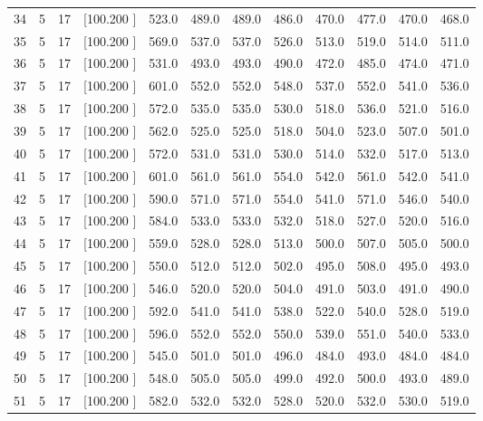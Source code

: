 \documentclass[12pt,a4paper]{article}
\begin{document}
\begin{center}
{\begin{tabular}{r r r r r r r r r r r r}
  34&  5& 17&[100.200   ]&   523.0&   489.0&   489.0&   486.0&   470.0&   477.0&   470.0&   468.0\\[-0.02in]
  35&  5& 17&[100.200   ]&   569.0&   537.0&   537.0&   526.0&   513.0&   519.0&   514.0&   511.0\\[-0.02in]
  36&  5& 17&[100.200   ]&   531.0&   493.0&   493.0&   490.0&   472.0&   485.0&   474.0&   471.0\\[-0.02in]
  37&  5& 17&[100.200   ]&   601.0&   552.0&   552.0&   548.0&   537.0&   552.0&   541.0&   536.0\\[-0.02in]
  38&  5& 17&[100.200   ]&   572.0&   535.0&   535.0&   530.0&   518.0&   536.0&   521.0&   516.0\\[-0.02in]
  39&  5& 17&[100.200   ]&   562.0&   525.0&   525.0&   518.0&   504.0&   523.0&   507.0&   501.0\\[-0.02in]
  40&  5& 17&[100.200   ]&   572.0&   531.0&   531.0&   530.0&   514.0&   532.0&   517.0&   513.0\\[-0.02in]
  41&  5& 17&[100.200   ]&   601.0&   561.0&   561.0&   554.0&   542.0&   561.0&   542.0&   541.0\\[-0.02in]
  42&  5& 17&[100.200   ]&   590.0&   571.0&   571.0&   554.0&   541.0&   571.0&   546.0&   540.0\\[-0.02in]
  43&  5& 17&[100.200   ]&   584.0&   533.0&   533.0&   532.0&   518.0&   527.0&   520.0&   516.0\\[-0.02in]
  44&  5& 17&[100.200   ]&   559.0&   528.0&   528.0&   513.0&   500.0&   507.0&   505.0&   500.0\\[-0.02in]
  45&  5& 17&[100.200   ]&   550.0&   512.0&   512.0&   502.0&   495.0&   508.0&   495.0&   493.0\\[-0.02in]
  46&  5& 17&[100.200   ]&   546.0&   520.0&   520.0&   504.0&   491.0&   503.0&   491.0&   490.0\\[-0.02in]
  47&  5& 17&[100.200   ]&   592.0&   541.0&   541.0&   538.0&   522.0&   540.0&   528.0&   519.0\\[-0.02in]
  48&  5& 17&[100.200   ]&   596.0&   552.0&   552.0&   550.0&   539.0&   551.0&   540.0&   533.0\\[-0.02in]
  49&  5& 17&[100.200   ]&   545.0&   501.0&   501.0&   496.0&   484.0&   493.0&   484.0&   484.0\\[-0.02in]
  50&  5& 17&[100.200   ]&   548.0&   505.0&   505.0&   499.0&   492.0&   500.0&   493.0&   489.0\\[-0.02in]
  51&  5& 17&[100.200   ]&   582.0&   532.0&   532.0&   528.0&   520.0&   532.0&   530.0&   519.0\\[-0.02in]

\end{tabular}}
\end{center}
\end{document}
